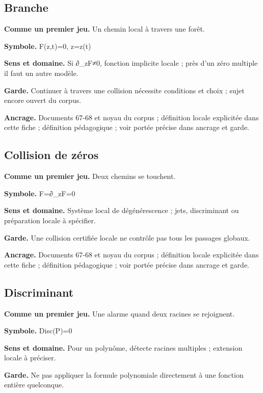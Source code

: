 \documentclass[
  9pt,
  a4paper,
]{article}
\begin{document}
\hypertarget{branche}{%
\subsection{Branche}\label{branche}}

\textbf{Comme un premier jeu.} Un chemin local à travers une forêt.

\textbf{Symbole.} F(z,t)=0, z=z(t)

\textbf{Sens et domaine.} Si ∂\_zF≠0, fonction implicite locale ; près
d'un zéro multiple il faut un autre modèle.

\textbf{Garde.} Continuer à travers une collision nécessite conditions
et choix ; sujet encore ouvert du corpus.

\textbf{Ancrage.} Documents 67-68 et noyau du corpus ; définition locale
explicitée dans cette fiche ; définition pédagogique ; voir portée
précise dans ancrage et garde.

\hypertarget{collision-de-zuxe9ros}{%
\subsection{Collision de zéros}\label{collision-de-zuxe9ros}}

\textbf{Comme un premier jeu.} Deux chemins se touchent.

\textbf{Symbole.} F=∂\_zF=0

\textbf{Sens et domaine.} Système local de dégénérescence ; jets,
discriminant ou préparation locale à spécifier.

\textbf{Garde.} Une collision certifiée locale ne contrôle pas tous les
passages globaux.

\textbf{Ancrage.} Documents 67-68 et noyau du corpus ; définition locale
explicitée dans cette fiche ; définition pédagogique ; voir portée
précise dans ancrage et garde.

\hypertarget{discriminant}{%
\subsection{Discriminant}\label{discriminant}}

\textbf{Comme un premier jeu.} Une alarme quand deux racines se
rejoignent.

\textbf{Symbole.} Disc(P)=0

\textbf{Sens et domaine.} Pour un polynôme, détecte racines multiples ;
extension locale à préciser.

\textbf{Garde.} Ne pas appliquer la formule polynomiale directement à
une fonction entière quelconque.
\end{document}
